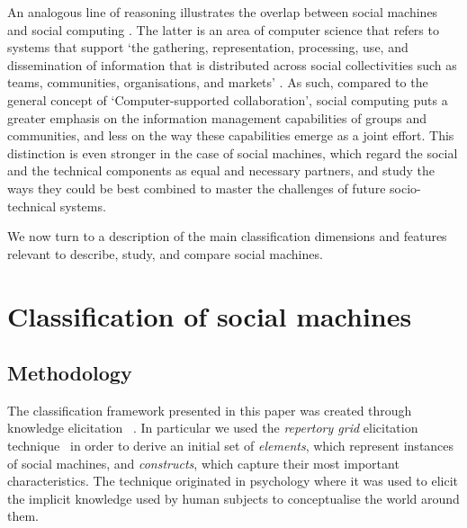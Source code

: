 \documentclass{sig-alternate}
\begin{document}
An analogous line of reasoning illustrates the overlap between social machines and social computing \cite{parameswaran2007research}. The latter is an area of computer science that refers to systems that support `the gathering, representation, processing, use, and dissemination of information that is distributed across social collectivities such as teams, communities, organisations, and markets' \cite{parameswaran2007research}. As such, compared to the general concept of `Computer-supported collaboration', social computing puts a greater emphasis on the information management capabilities of groups and communities, and less on the way these capabilities emerge as a joint effort. This distinction is even stronger in the case of social machines, which regard the social and the technical components as equal and necessary partners, and study the ways they could be best combined to master the challenges of future socio-technical systems.

We now turn to a description of the main classification dimensions and features relevant to describe, study, and compare social machines.

\section{Classification of social machines}
\label{sec:framework}

\subsection{Methodology}
\label{sec:methodology}
The classification framework presented in this paper was created through knowledge elicitation ~\cite{knowledgeelicitation}. In particular we used the {\it repertory grid} elicitation
technique~\cite{kelly} in order to derive an initial set of {\it elements}, which represent instances of social machines, and {\it constructs}, which capture their most important characteristics. The technique originated in psychology where it was used to elicit the implicit knowledge used by human subjects to conceptualise the world around them.
\end{document}
